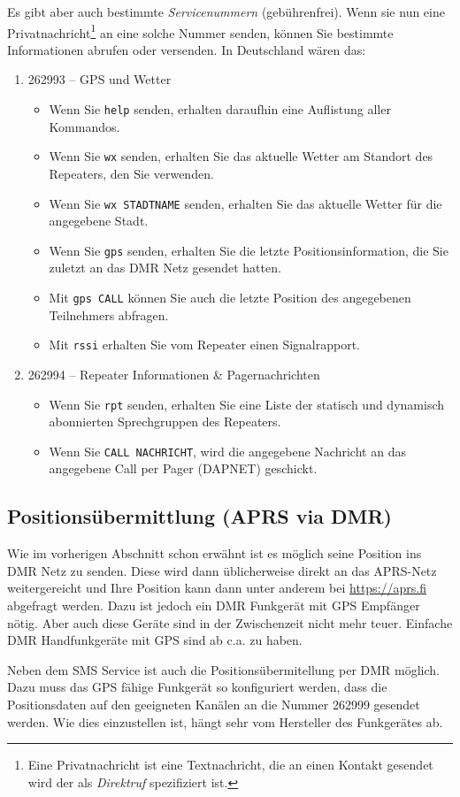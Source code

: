 Es gibt aber auch bestimmte \emph{Servicenummern} (gebührenfrei). Wenn sie nun eine Privatnachricht\footnote{Eine Privatnachricht ist eine Textnachricht, die an einen Kontakt gesendet wird der als \emph{Direktruf} spezifiziert ist.} an eine solche Nummer senden, können Sie bestimmte Informationen abrufen oder versenden. In Deutschland wären das:
\begin{enumerate}
 \item 262993 -- GPS und Wetter
 \begin{itemize}
  \item Wenn Sie \texttt{help} senden, erhalten daraufhin eine Auflistung aller Kommandos.
  \item Wenn Sie \texttt{wx} senden, erhalten Sie das aktuelle Wetter am Standort des Repeaters, den Sie verwenden.
  \item Wenn Sie \texttt{wx STADTNAME} senden, erhalten Sie das aktuelle Wetter für die angegebene Stadt.
  \item Wenn Sie \texttt{gps} senden, erhalten Sie die letzte Positionsinformation, die Sie zuletzt an das DMR Netz gesendet hatten.
  \item Mit \texttt{gps CALL} können Sie auch die letzte Position des angegebenen Teilnehmers abfragen.
  \item Mit \texttt{rssi} erhalten Sie vom Repeater einen Signalrapport.
 \end{itemize} 
 \item 262994 -- Repeater Informationen \& Pagernachrichten
  \begin{itemize}
   \item Wenn Sie \texttt{rpt} senden, erhalten Sie eine Liste der statisch und dynamisch abonnierten Sprechgruppen des Repeaters.  
   \item Wenn Sie \texttt{CALL NACHRICHT}, wird die angegebene Nachricht an das angegebene Call per Pager (DAPNET) geschickt.
  \end{itemize}
\end{enumerate}
 
\subsection{Positionsübermittlung (APRS via DMR)} \label{sec:aprs}
Wie im vorherigen Abschnitt schon erwähnt ist es möglich seine Position ins DMR Netz zu senden. Diese wird dann üblicherweise direkt an das APRS-Netz weitergereicht und Ihre Position kann dann unter anderem bei \url{https://aprs.fi} abgefragt werden. Dazu ist jedoch ein DMR Funkgerät mit GPS Empfänger nötig. Aber auch diese Geräte sind in der Zwischenzeit nicht mehr teuer. Einfache DMR Handfunkgeräte mit GPS sind ab c.a.  zu haben. 

Neben dem SMS Service ist auch die Positionsübermitellung per DMR möglich. Dazu muss das GPS fähige Funkgerät so konfiguriert werden, dass die Positionsdaten auf den geeigneten Kanälen an die Nummer 262999 gesendet werden. Wie dies einzustellen ist, hängt sehr vom Hersteller des Funkgerätes ab. 